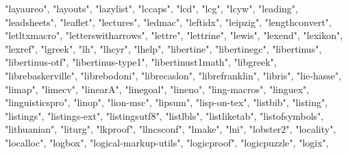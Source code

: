 \documentclass[
]{article}
\newenvironment{Shaded}{\begin{snugshade}}{\end{snugshade}}
\newcommand{\NormalTok}[1]{#1}
\newcommand{\StringTok}[1]{\textcolor[rgb]{0.31,0.60,0.02}{#1}}
\begin{document}
\begin{Shaded}
\begin{Highlighting}[]
\StringTok{"layaureo"}\NormalTok{, }\StringTok{"layouts"}\NormalTok{, }\StringTok{"lazylist"}\NormalTok{, }\StringTok{"lccaps"}\NormalTok{, }\StringTok{"lcd"}\NormalTok{, }\StringTok{"lcg"}\NormalTok{, }\StringTok{"lcyw"}\NormalTok{, }
\StringTok{"leading"}\NormalTok{, }\StringTok{"leadsheets"}\NormalTok{, }\StringTok{"leaflet"}\NormalTok{, }\StringTok{"lectures"}\NormalTok{, }\StringTok{"ledmac"}\NormalTok{, }\StringTok{"leftidx"}\NormalTok{, }
\StringTok{"leipzig"}\NormalTok{, }\StringTok{"lengthconvert"}\NormalTok{, }\StringTok{"letltxmacro"}\NormalTok{, }\StringTok{"letterswitharrows"}\NormalTok{, }
\StringTok{"lettre"}\NormalTok{, }\StringTok{"lettrine"}\NormalTok{, }\StringTok{"lewis"}\NormalTok{, }\StringTok{"lexend"}\NormalTok{, }\StringTok{"lexikon"}\NormalTok{, }\StringTok{"lexref"}\NormalTok{, }
\StringTok{"lgreek"}\NormalTok{, }\StringTok{"lh"}\NormalTok{, }\StringTok{"lhcyr"}\NormalTok{, }\StringTok{"lhelp"}\NormalTok{, }\StringTok{"libertine"}\NormalTok{, }\StringTok{"libertinegc"}\NormalTok{, }
\StringTok{"libertinus"}\NormalTok{, }\StringTok{"libertinus{-}otf"}\NormalTok{, }\StringTok{"libertinus{-}type1"}\NormalTok{, }\StringTok{"libertinust1math"}\NormalTok{, }
\StringTok{"libgreek"}\NormalTok{, }\StringTok{"librebaskerville"}\NormalTok{, }\StringTok{"librebodoni"}\NormalTok{, }\StringTok{"librecaslon"}\NormalTok{, }
\StringTok{"librefranklin"}\NormalTok{, }\StringTok{"libris"}\NormalTok{, }\StringTok{"lie{-}hasse"}\NormalTok{, }\StringTok{"limap"}\NormalTok{, }\StringTok{"limecv"}\NormalTok{, }\StringTok{"linearA"}\NormalTok{, }
\StringTok{"linegoal"}\NormalTok{, }\StringTok{"lineno"}\NormalTok{, }\StringTok{"ling{-}macros"}\NormalTok{, }\StringTok{"linguex"}\NormalTok{, }\StringTok{"linguisticspro"}\NormalTok{, }
\StringTok{"linop"}\NormalTok{, }\StringTok{"lion{-}msc"}\NormalTok{, }\StringTok{"lipsum"}\NormalTok{, }\StringTok{"lisp{-}on{-}tex"}\NormalTok{, }\StringTok{"listbib"}\NormalTok{, }\StringTok{"listing"}\NormalTok{, }
\StringTok{"listings"}\NormalTok{, }\StringTok{"listings{-}ext"}\NormalTok{, }\StringTok{"listingsutf8"}\NormalTok{, }\StringTok{"listlbls"}\NormalTok{, }\StringTok{"listliketab"}\NormalTok{, }
\StringTok{"listofsymbols"}\NormalTok{, }\StringTok{"lithuanian"}\NormalTok{, }\StringTok{"liturg"}\NormalTok{, }\StringTok{"lkproof"}\NormalTok{, }\StringTok{"llncsconf"}\NormalTok{, }
\StringTok{"lmake"}\NormalTok{, }\StringTok{"lni"}\NormalTok{, }\StringTok{"lobster2"}\NormalTok{, }\StringTok{"locality"}\NormalTok{, }\StringTok{"localloc"}\NormalTok{, }\StringTok{"logbox"}\NormalTok{, }
\StringTok{"logical{-}markup{-}utils"}\NormalTok{, }\StringTok{"logicproof"}\NormalTok{, }\StringTok{"logicpuzzle"}\NormalTok{, }\StringTok{"logix"}\NormalTok{, }

\end{Highlighting}
\end{Shaded}
\end{document}

